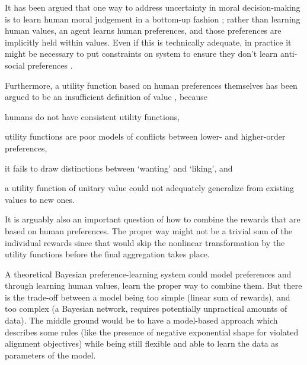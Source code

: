 It has been argued that one way to address uncertainty in moral decision-making is to learn human moral judgement in a bottom-up fashion \cite{bogosian_implementation_2017}; rather than learning human values, an agent learns human preferences, and those preferences are implicitly held within values. Even if this is technically adequate, in practice it might be necessary to put constraints on system to ensure they don't learn anti-social preferences \cite{neff2016talking}.


Furthermore, a utility function based on human preferences themselves has been argued to be an insufficient definition of value \cite{sotala2016defining, DBLP:journals/corr/abs-1712-05812}, because \begin{enumerate*}
    \item humans do not have consistent utility functions,
    \item utility functions are poor models of conflicts between lower- and higher-order preferences,
    \item it fails to draw distinctions between `wanting' and `liking', and
    \item a utility function of unitary value could not adequately generalize from existing values to new ones.
\end{enumerate*}
It is arguably also an important question of how to combine the rewards that are based on human preferences. The proper way might not be a trivial sum of the individual rewards since that would skip the nonlinear transformation by the utility functions before the final aggregation takes place. 

A theoretical Bayesian preference-learning system could model preferences and through learning human values, learn the proper way to combine them. But there is the trade-off between a model being too simple (linear sum of rewards), and too complex (a Bayesian network, requires potentially unpractical amounts of data). The middle ground would be to have a model-based approach which describes some rules (like the presence of negative exponential shape for violated alignment objectives) while being still flexible and able to learn the data as parameters of the model.

